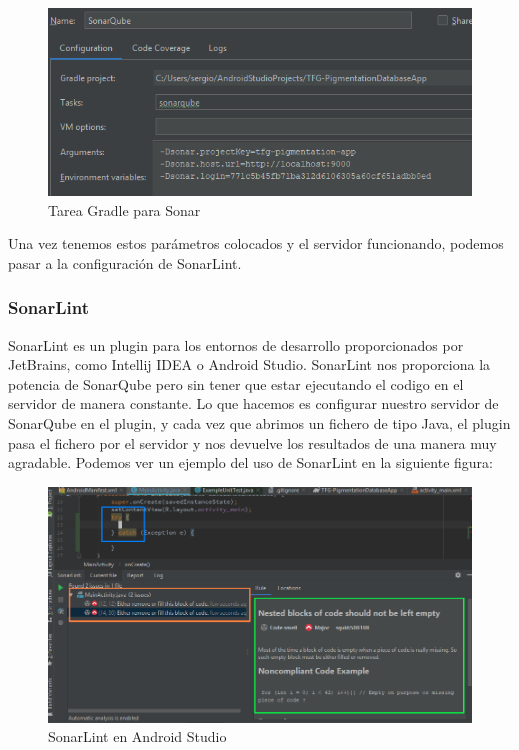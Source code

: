 \begin{figure}[H]
    \centering
    \includegraphics[scale=1]{imagenes/fundamentosHerramientas/sonarGradleTask.png}
    \caption{Tarea Gradle para Sonar}
    \label{fig:sonarGradleTask}
\end{figure}

Una vez tenemos estos parámetros colocados y el servidor funcionando, podemos pasar a la configuración de SonarLint.

\subsubsection{SonarLint}
SonarLint \cite{sonarlint} es un plugin para los entornos de desarrollo proporcionados por JetBrains, como Intellij IDEA o Android Studio. SonarLint nos proporciona la potencia de SonarQube pero sin tener que estar ejecutando el codigo en el servidor de manera constante. Lo que hacemos es configurar nuestro servidor de SonarQube en el plugin, y cada vez que abrimos un fichero de tipo Java, el plugin pasa el fichero por el servidor y nos devuelve los resultados de una manera muy agradable. Podemos ver un ejemplo del uso de SonarLint en la siguiente figura:

\begin{figure}[H]
    \centering
    \includegraphics[scale=0.5]{imagenes/fundamentosHerramientas/sonarLint.png}
    \caption{SonarLint en Android Studio}
    \label{fig:sonarLinr}
\end{figure}

